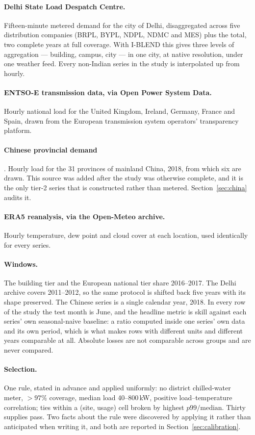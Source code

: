 \paragraph{Delhi State Load Despatch Centre.} Fifteen-minute metered demand for
the city of Delhi, disaggregated across five distribution companies (BRPL, BYPL,
NDPL, NDMC and MES) plus the total, two complete years at full coverage. With
I-BLEND this gives three levels of aggregation --- building, campus, city --- in
one city, at native resolution, under one weather feed. Every non-Indian series
in the study is interpolated up from hourly.

\paragraph{ENTSO-E transmission data, via Open Power System Data.} Hourly
national load for the United Kingdom, Ireland, Germany, France and Spain, drawn
from the European transmission system operators' transparency platform.

\paragraph{Chinese provincial demand} \citep{wu2023china}. Hourly load for the
31 provinces of mainland China, 2018, from which six are drawn. This source was
added after the study was otherwise complete, and it is the only tier-2 series
that is constructed rather than metered. Section~\ref{sec:china} audits it.

\paragraph{ERA5 reanalysis, via the Open-Meteo archive.} Hourly temperature, dew
point and cloud cover at each location, used identically for every series.

\paragraph{Windows.} The building tier and the European national tier share
2016--2017. The Delhi archive covers 2011--2012, so the same protocol is shifted
back five years with its shape preserved. The Chinese series is a single
calendar year, 2018. In every row of the study the test month is June, and the
headline metric is skill against each series' own seasonal-naive baseline: a
ratio computed inside one series' own data and its own period, which is what
makes rows with different units and different years comparable at all. Absolute
losses are not comparable across groups and are never compared.

\paragraph{Selection.} One rule, stated in advance and applied uniformly: no
district chilled-water meter, $>$$97\%$ coverage, median load 40--800\,kW,
positive load--temperature correlation; ties within a (site, usage) cell broken
by highest $p99/\text{median}$. Thirty supplies pass. Two facts about the rule
were discovered by applying it rather than anticipated when writing it, and both
are reported in Section~\ref{sec:calibration}.
